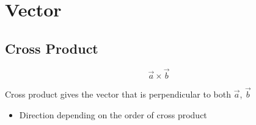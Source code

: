 \chapter{Vector}

\section{Cross Product}

  \begin{equation}
    \vec{a} \times \vec{b}
  \end{equation}

  Cross product gives the vector that is perpendicular to both $ \vec{a} $,
  $ \vec{b} $

  \begin{itemize}
    \item Direction depending on the order of cross product
  \end{itemize}
